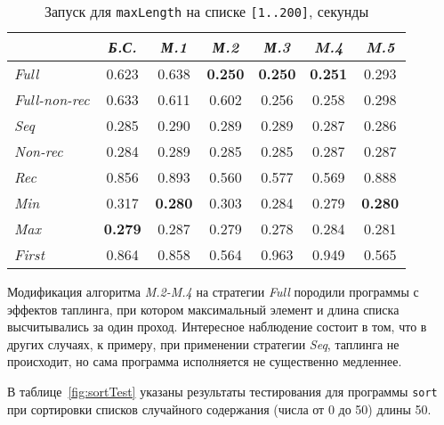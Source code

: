 \begin{table}[h!]
\center
\begin{tabular}{|l|c|c|c|c|c|c|}
\hline
                  &{\it Б.С.}   &{\it М.1}      &{\it М.2}      &{\it М.3}&{\it M.4} & {\it M.5}\\ \hline
{\it Full        } & 0.623        & 0.638       & {\bf 0.250}  & {\bf 0.250} & {\bf 0.251} & 0.293 \\ \hline
{\it Full-non-rec} & 0.633        & 0.611       & 0.602        & 0.256       & 0.258 & 0.298 \\ \hline
{\it Seq         } & 0.285        & 0.290       & 0.289        & 0.289       & 0.287 & 0.286 \\ \hline
{\it Non-rec     } & 0.284        & 0.289       & 0.285        & 0.285       & 0.287 & 0.287 \\ \hline
{\it Rec         } & 0.856        & 0.893       & 0.560        & 0.577       & 0.569 & 0.888 \\ \hline
{\it Min         } & 0.317        & {\bf 0.280} & 0.303        & 0.284       & 0.279 & {\bf 0.280} \\ \hline
{\it Max         } & {\bf 0.279}  & 0.287       & 0.279        & 0.278       & 0.284 & 0.281 \\ \hline
{\it First       } & 0.864        & 0.858       & 0.564        & 0.963       & 0.949 & 0.565 \\ \hline


\end{tabular}
\caption{Запуск для \lstinline{maxLength} на списке \lstinline{[1..200]}, секунды}
\label{fig:maxlenTest}
\end{table}

Модификация алгоритма {\it M.2-M.4} на стратегии {\it Full} породили программы
с эффектов таплинга, при котором максимальный элемент и длина списка высчитывались
за один проход. Интересное наблюдение состоит в том, что в других случаях, к примеру,
при применении стратегии {\it Seq}, таплинга не происходит, но сама программа
исполняется не существенно медленнее.

В таблице~\ref{fig:sortTest} указаны результаты тестирования для
программы \lstinline{sort} при сортировки списков случайного содержания (числа от 0 до 50)
длины 50.

